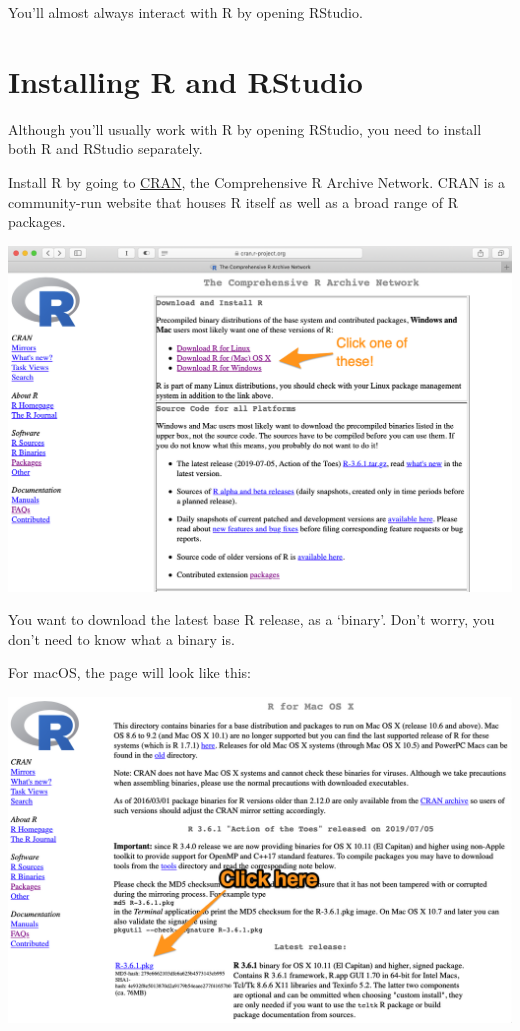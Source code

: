 \documentclass[]{book}
\begin{document}
You'll almost always interact with R by opening RStudio.

\hypertarget{installing-r-and-rstudio}{%
\section{Installing R and RStudio}\label{installing-r-and-rstudio}}

Although you'll usually work with R by opening RStudio, you need to install both R and RStudio separately.

Install R by going to \href{https://cran.r-project.org}{CRAN}, the Comprehensive R Archive Network. CRAN is a community-run website that houses R itself as well as a broad range of R packages.

\includegraphics[width=15.69in]{atlas/r_cran}

You want to download the latest base R release, as a `binary'. Don't worry, you don't need to know what a binary is.

For macOS, the page will look like this:

\includegraphics[width=15.68in]{atlas/r_cran_macos}
\end{document}
